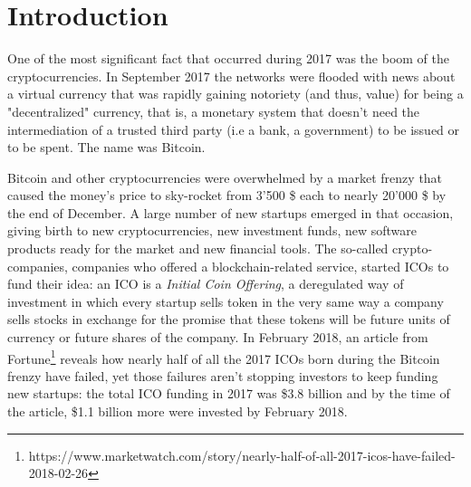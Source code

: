 
	\chapter{Introduction}
		One of the most significant fact that occurred during 2017 was the boom of the cryptocurrencies. In September 2017 the networks were flooded with news about a virtual currency that was rapidly gaining notoriety (and thus, value) for being a "decentralized" currency, that is, a monetary system that doesn't need the intermediation of a trusted third party (i.e a bank, a government) to be issued or to be spent. The name was Bitcoin.
		
		Bitcoin and other cryptocurrencies were overwhelmed by a market frenzy that caused the money's price to sky-rocket from 3'500 \$ each to nearly 20'000 \$ by the end of December. A large number of new startups emerged in that occasion, giving birth to new cryptocurrencies, new investment funds, new software products ready for the market and new financial tools. The so-called crypto-companies, companies who offered a blockchain-related service, started ICOs to fund their idea: an ICO is a \textit{Initial Coin Offering}, a deregulated way of investment in which every startup sells token in the very same way a company sells stocks in exchange for the promise that these tokens will be future units of currency or future shares of the company. In February 2018, an article from Fortune\footnote{https://www.marketwatch.com/story/nearly-half-of-all-2017-icos-have-failed-2018-02-26} reveals how nearly half of all the 2017 ICOs born during the Bitcoin frenzy have failed, yet those failures aren't stopping investors to keep funding new startups: the total ICO funding in 2017 was \$3.8 billion and by the time of the article, \$1.1 billion more were invested by February 2018.
		

